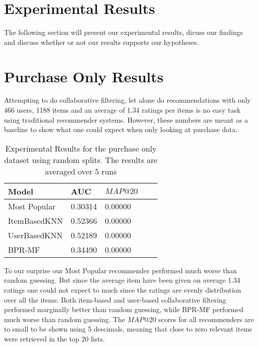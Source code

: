 
\section{Experimental Results}
\label{sec:results}

The following section will present our experimental results, dicuss our findings and
discuss whether or not our results supports our hypotheses.

\section{Purchase Only Results}

Attempting to do collaborative filtering, let alone do recommendations with only 466 users, 1188 items and
an average of 1.34 ratings per items is no easy task using traditional recommender systems. However, these numbers
are meant as a baseline to show what one could expect when only looking at purchase data.

\begin{table}[H]
    \centering
    \begin{tabular}{*{5}l}
    \toprule
    Model           &   AUC         &   $MAP@20$ \\ \midrule
    \rowcolor{Gray}
    Most Popular    &   0.30314     &   0.00000 \\
    ItemBasedKNN    &   0.52366     &   0.00000 \\
    UserBasedKNN    &   0.52189     &   0.00000 \\
    BPR-MF          &   0.34490     &   0.00000 \\
    \bottomrule
    \end{tabular}
\caption[Experimental Results - Purchase Only Dataset]{Experimental Results for the purchase only dataset using random splits. The results are averaged over 5 runs}
\label{table:results-purchase-only}
\end{table}

To our surprise our Most Popular recommender performed much worse than random guessing. But since the average item
have been given on average 1.34 ratings one could not expect to much since the ratings are evenly distribution over
all the items. Both item-based and user-based collaborative filtering performed marginally better than random guessing,
while BPR-MF performed much worse than random guessing. The $MAP@20$ scores for all recommenders are to small to be shown
using 5 descimals, meaning that close to zero relevant items were retrieved in the top 20 lists.

